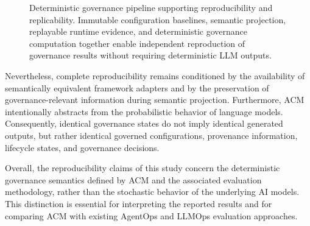 \documentclass[10pt]{article}
\begin{document}
\begin{figure}[t]
    \centering
    \caption{Deterministic governance pipeline supporting reproducibility and replicability. Immutable configuration baselines, semantic projection, replayable runtime evidence, and deterministic governance computation together enable independent reproduction of governance results without requiring deterministic LLM outputs.}
    \label{fig:reproducibility_pipeline}
\end{figure}

Nevertheless, complete reproducibility remains conditioned by the availability of semantically equivalent framework adapters and by the preservation of governance-relevant information during semantic projection. Furthermore, ACM intentionally abstracts from the probabilistic behavior of language models. Consequently, identical governance states do not imply identical generated outputs, but rather identical governed configurations, provenance information, lifecycle states, and governance decisions.

Overall, the reproducibility claims of this study concern the deterministic governance semantics defined by ACM and the associated evaluation methodology, rather than the stochastic behavior of the underlying AI models. This distinction is essential for interpreting the reported results and for comparing ACM with existing AgentOps and LLMOps evaluation approaches.
\end{document}
